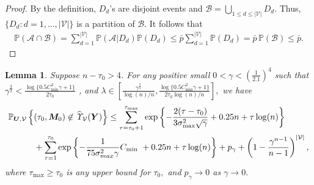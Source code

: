 \documentclass[12pt]{article}
\theoremstyle{shortspace}
\newtheorem{lemma}{Lemma}
\def\*#1{\bm{#1}}
\def\P{\mathbb P}
\begin{document}
\begin{proof}
By the definition, $D_d$'s are disjoint events and
${\mathcal B} = \bigcup_{1 \leq d \leq |\mathcal V|} D_d$. Thus,  $\{D_d:  d= 1, \dots, |{\mathcal V|}\}$ is a partition of $\mathcal B$. It follows that 
\begin{align*}
\P(\mathcal A \cap \mathcal B) = \sum_{d =1}^{|{\mathcal V}|} \P(\mathcal A | D_d) \P(D_d) \leq \bar p \sum_{d = 1}^{|{\mathcal V|}}  \P(D_d)  = \bar p \, \P({\mathcal B}) \leq \bar p.    
\end{align*}

\end{proof}

\begin{lemma}
\label{lem:bound_single_ustar}
Suppose $n-\tau_0>4$. For any positive small $0 < \gamma < (\frac{1}{2.1})^4$ such that 
$\gamma^{\frac 32} < \frac{\log\{0.5C^2_{\min}\gamma + 1\}}{2 \tau_0 } $ , and $\lambda \in [\frac{\gamma^{\frac32}}{\log(n)/n},\frac{\log\{0.5C^2_{\min}\gamma + 1\}}{2 \tau_0 \log(n)/n}],$ we have 
\begin{align}
\label{eq:prob_bound_C_D_simple-1}
      &  \P_{\*U,\mathcal V  }\left\{(\tau_0, \*M_0) \not\in \widehat{\it \Upsilon}_{{\mathcal V}}(\*Y)\right\} 
       \leq \sum^{\tau_{\max}}_{\tau=\tau_0+1}
    \exp\left\{-\frac{2(\tau-\tau_0)}{3\sigma^2_{\max}\sqrt{\gamma}}    + 0.25n +  \tau\log(n) \right\} \nonumber \\
    & \quad \qquad  +  \sum_{\tau=1}^{\tau_0} \exp\left\{-\frac{1}{75\sigma^2_{max}\gamma} C_{\min}\ + 0.25n + \tau\log(n)\right\}
     + p_\gamma + \left(1-\frac{\gamma^{n-1}}{n-1}\right)^{|{\mathcal V}|},
\end{align}
where $\tau_{\max} \geq \tau_0$ is any upper bound for $\tau_0,$ and $p_\gamma \rightarrow 0$ as $\gamma \rightarrow 0.$ 
\end{lemma}
\end{document}
